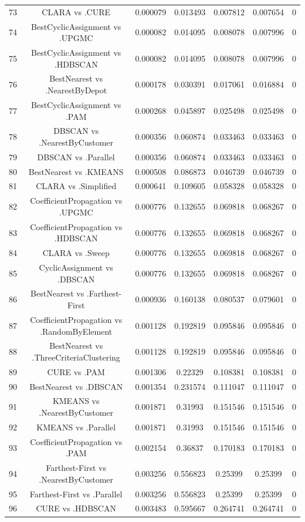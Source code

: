 \documentclass[a4paper,10pt]{article}
\begin{document}
\begin{landscape}
\begin{table}[!htp]
\begin{tabular}{ccccccc}
73&CLARA vs .CURE&0.000079&0.013493&0.007812&0.007654&0\\
74&BestCyclicAssignment vs .UPGMC&0.000082&0.014095&0.008078&0.007996&0\\
75&BestCyclicAssignment vs .HDBSCAN&0.000082&0.014095&0.008078&0.007996&0\\
76&BestNearest vs .NearestByDepot&0.000178&0.030391&0.017061&0.016884&0\\
77&BestCyclicAssignment vs .PAM&0.000268&0.045897&0.025498&0.025498&0\\
78&DBSCAN vs .NearestByCustomer&0.000356&0.060874&0.033463&0.033463&0\\
79&DBSCAN vs .Parallel&0.000356&0.060874&0.033463&0.033463&0\\
80&BestNearest vs .KMEANS&0.000508&0.086873&0.046739&0.046739&0\\
81&CLARA vs .Simplified&0.000641&0.109605&0.058328&0.058328&0\\
82&CoefficientPropagation vs .UPGMC&0.000776&0.132655&0.069818&0.068267&0\\
83&CoefficientPropagation vs .HDBSCAN&0.000776&0.132655&0.069818&0.068267&0\\
84&CLARA vs .Sweep&0.000776&0.132655&0.069818&0.068267&0\\
85&CyclicAssignment vs .DBSCAN&0.000776&0.132655&0.069818&0.068267&0\\
86&BestNearest vs .Farthest-First&0.000936&0.160138&0.080537&0.079601&0\\
87&CoefficientPropagation vs .RandomByElement&0.001128&0.192819&0.095846&0.095846&0\\
88&BestNearest vs .ThreeCriteriaClustering&0.001128&0.192819&0.095846&0.095846&0\\
89&CURE vs .PAM&0.001306&0.22329&0.108381&0.108381&0\\
90&BestNearest vs .DBSCAN&0.001354&0.231574&0.111047&0.111047&0\\
91&KMEANS vs .NearestByCustomer&0.001871&0.31993&0.151546&0.151546&0\\
92&KMEANS vs .Parallel&0.001871&0.31993&0.151546&0.151546&0\\
93&CoefficientPropagation vs .PAM&0.002154&0.36837&0.170183&0.170183&0\\
94&Farthest-First vs .NearestByCustomer&0.003256&0.556823&0.25399&0.25399&0\\
95&Farthest-First vs .Parallel&0.003256&0.556823&0.25399&0.25399&0\\
96&CURE vs .HDBSCAN&0.003483&0.595667&0.264741&0.264741&0\\

\end{tabular}
\end{table}
\end{landscape}
\end{document}
